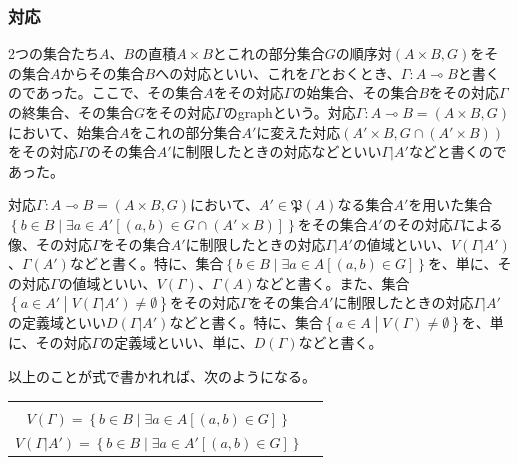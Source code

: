 \documentclass[a4paper]{jsarticle}
\begin{document}
\subsubsection{対応}%
2つの集合たち$A$、$B$の直積$A \times B$とこれの部分集合$G$の順序対$(A \times B,G)$をその集合$A$からその集合$B$への対応といい、これを$\varGamma$とおくとき、$\varGamma:A \multimap B$と書くのであった。ここで、その集合$A$をその対応$\varGamma$の始集合、その集合$B$をその対応$\varGamma$の終集合、その集合$G$をその対応$\varGamma$のgraphという。対応$\varGamma:A \multimap B = (A \times B,G)$において、始集合$A$をこれの部分集合$A'$に変えた対応$\left( A' \times B,G \cap \left( A' \times B \right) \right)$をその対応$\varGamma$のその集合$A'$に制限したときの対応などといい$\varGamma|A'$などと書くのであった。\par
対応$\varGamma:A \multimap B = (A \times B,G)$において、$A'\in \mathfrak{P}(A)$なる集合$A'$を用いた集合$\left\{ b \in B \middle| \exists a \in A'\left[ (a,b) \in G \cap \left( A' \times B \right) \right] \right\}$をその集合$A'$のその対応$\varGamma$による像、その対応$\varGamma$をその集合$A'$に制限したときの対応$\varGamma|A'$の値域といい、$V\left( \varGamma|A' \right)$、$\varGamma\left( A' \right)$などと書く。特に、集合$\left\{ b \in B \middle| \exists a \in A\left[ (a,b) \in G \right] \right\}$を、単に、その対応$\varGamma$の値域といい、$V(\varGamma)$、$\varGamma(A)$などと書く。また、集合$\left\{ a \in A' \middle| V\left( \varGamma|A' \right) \neq \emptyset \right\}$をその対応$\varGamma$をその集合$A'$に制限したときの対応$\varGamma|A'$の定義域といい$D\left( \varGamma|A' \right)$などと書く。特に、集合$\left\{ a \in A \middle| V(\varGamma) \neq \emptyset \right\}$を、単に、その対応$\varGamma$の定義域といい、単に、$D(\varGamma)$などと書く。\par
以上のことが式で書かれれば、次のようになる。
\begin{longtable}[c]{cc}
\hspace{-0.5em}\begin{tabular}{l}
  $D(\varGamma) = \left\{ a \in A \middle| V(\varGamma) \neq \emptyset \right\} $\\
  $V(\varGamma) = \left\{ b \in B \middle| \exists a \in A\left[ (a,b) \in G \right] \right\} $
\end{tabular} & \hspace{-0.5em}\begin{tabular}{l}
  $D\left( \varGamma|A' \right) = \left\{ a \in A \middle| V\left( \varGamma|A' \right) \neq \emptyset \right\} $ \\
  $V\left( \varGamma|A' \right) = \left\{ b \in B \middle| \exists a \in A'\left[ (a,b) \in G \right] \right\} $ 
\end{tabular} \\
\end{longtable}
\end{document}
